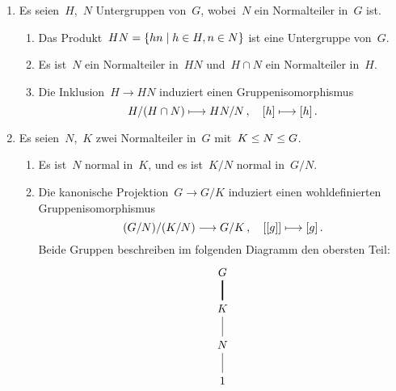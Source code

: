 \begin{corollary}
  \leavevmode
  \begin{enumerate}
    \item
      Es seien~$H$,~$N$ Untergruppen von~$G$, wobei~$N$ ein Normalteiler in~$G$ ist.
      \begin{enumerate}
        \item
          Das Produkt~$HN = \{ hn \suchthat h \in H, n \in N \}$ ist eine Untergruppe von~$G$.
        \item
          Es ist~$N$ ein Normalteiler in~$HN$ und~$H \cap N$ ein Normalteiler in~$H$.
        \item
          Die Inklusion~$H \to HN$ induziert einen Gruppenisomorphismus
          \[
            H / (H \cap N)
            \mapsto
            HN / N \,,
            \quad
            \class{h}
            \mapsto
            \class{h} \,.
          \]
      \end{enumerate}
    \item
      Es seien~$N$,~$K$ zwei Normalteiler in~$G$ mit~$K \leq N \leq G$.
      \begin{enumerate}
        \item
          Es ist~$N$ normal in~$K$, und es ist~$K/N$ normal in~$G/N$.
        \item
          Die kanonische Projektion~$G \to G/K$ induziert einen wohldefinierten Gruppenisomorphismus
          \[
            (G/N) / (K/N)
            \to
            G / K \,,
            \quad
            \class{ \class{g} }
            \mapsto
            \class{g} \,.
          \]
          Beide Gruppen beschreiben im folgenden Diagramm den obersten Teil:
          \[
            \begin{tikzcd}
              G
              \\
              K
              \arrow[very thick, dash]{u}
              \\
              N
              \arrow[dash]{u}
              \\
              1
              \arrow[dash]{u}
            \end{tikzcd}
          \]
      \end{enumerate}
  \end{enumerate}
\end{corollary}





